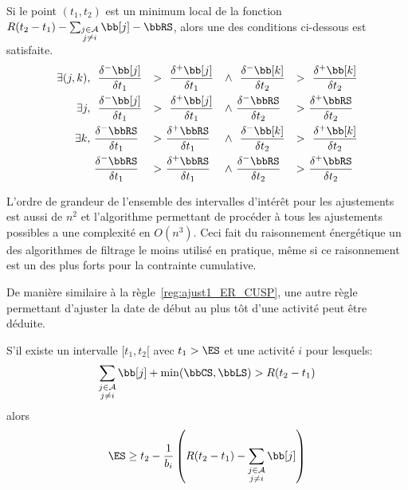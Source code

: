 \begin{lemma}
\label{lem:min_ajust_ER_CUSP}
  Si le point $(t_1,t_2)$ est un minimum local de la fonction
  $R(t_2-t_1) -\sum_{\substack{j \in \A \\ j \neq i}} \bb[j] - \bbRS
  $, alors une des conditions ci-dessous est satisfaite.
  \begin{align} 
    \exists (j,k), \ &~\frac{\delta^{-}\bb[j]}{\delta t_1}
    &>~&~\frac{\delta^{+}\bb[j]}{\delta t_1}
    &\land~&~\frac{\delta^{-}\bb[k]}{\delta t_2} & >~&
                                                       ~\frac{\delta^{+}\bb[k]}{\delta t_2} \label{eq:deriv1_adj_CUSP}\\
    \exists j , \ &~\frac{\delta^{-}\bb[j]}{\delta t_1}
    &>~&~\frac{\delta^{+}\bb[j]}{\delta t_1}
    &\land~&\frac{\delta^{-}\bbRS}{\delta t_2} & >~&
                                                        \frac{\delta^{+}\bbRS}{\delta t_2} \label{eq:deriv2_adj_CUSP}\\
    \exists k, \ &\frac{\delta^{-}\bbRS}{\delta t_1}
    &>~&\frac{\delta^{+}\bbRS}{\delta t_1}
    &\land~&~\frac{\delta^{-}\bb[k]}{\delta t_2} & >~&
                                                       ~\frac{\delta^{+}\bb[k]}{\delta t_2} \label{eq:deriv3_adj_CUSP}\\
                     &\frac{\delta^{-}\bbRS}{\delta t_1}
    &>~&\frac{\delta^{+}\bbRS}{\delta t_1}
    &\land~&\frac{\delta^{-}\bbRS}{\delta t_2} & >~&
                                                        \frac{\delta^{+}\bbRS}{\delta t_2} \label{eq:deriv4_adj_CUSP}
  \end{align}
\end{lemma}

L'ordre de grandeur de l'ensemble des intervalles d'intérêt pour les
ajustements est aussi de $n^2$ et l'algorithme permettant de procéder
à tous les ajustements possibles a une complexité en $O(n^3)$. Ceci
fait du raisonnement énergétique un des algorithmes de filtrage le
moins utilisé en pratique, même si ce raisonnement est un des plus
forts pour la contrainte cumulative.


De manière similaire à la règle~\ref{reg:ajust1_ER_CUSP}, une autre
règle permettant d'ajuster la date de début au plus tôt d'une activité
peut être déduite.

\begin{reg}
  \label{reg:ajust2_ER_CUSP}
  S'il existe un intervalle $[t_1,t_2[$ avec $t_1 > \ES$ et une
activité $i$ pour lesquels:
  \[ \sum_{\substack{j \in \A \\ j \neq i}} \bb[j] +
    \min(\bbCS,\bbLS) > R (t_2-t_1)\] 
  alors 
  \[  \ES \ge t_2 - \frac{1}{b_i} \left(R (t_2-t_1)  -\sum_{\substack{j \in \A \\ j
          \neq i}} \bb[j]  \right) \]
\end{reg}

